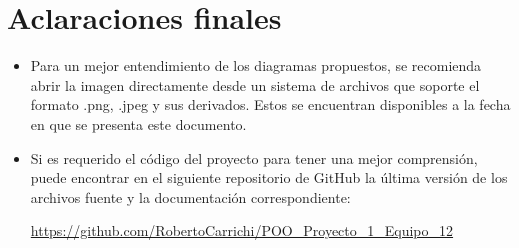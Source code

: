 \documentclass[12pt]{report}
\begin{document}
\section*{Aclaraciones finales}
\begin{itemize}
    \item Para un mejor entendimiento de los diagramas propuestos, se recomienda abrir la imagen directamente desde un sistema de archivos que soporte el formato .png, .jpeg y sus derivados. Estos se encuentran disponibles a la fecha en que se presenta este documento.
    \item Si es requerido el código del proyecto para tener una mejor comprensión, puede encontrar en el siguiente repositorio de GitHub la última versión de los archivos fuente y la documentación correspondiente:  
    \begin{center}
        \url{https://github.com/RobertoCarrichi/POO_Proyecto_1_Equipo_12}
    \end{center}
\end{itemize}






\end{document}
